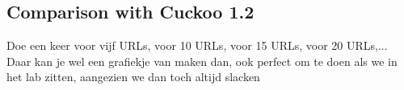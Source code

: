 \restoregeometry
\subsection{Comparison with Cuckoo 1.2}

Doe een keer voor vijf URLs, voor 10 URLs, voor 15 URLs, voor 20 URLs,...
Daar kan je wel een grafiekje van maken dan, ook perfect om te doen
als we in het lab zitten, aangezien we dan toch altijd slacken




